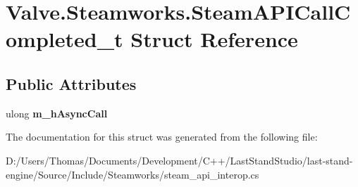 \hypertarget{structValve_1_1Steamworks_1_1SteamAPICallCompleted__t}{}\section{Valve.\+Steamworks.\+Steam\+A\+P\+I\+Call\+Completed\+\_\+t Struct Reference}
\label{structValve_1_1Steamworks_1_1SteamAPICallCompleted__t}
\subsection*{Public Attributes}
\begin{DoxyCompactItemize}
\item 
\hypertarget{structValve_1_1Steamworks_1_1SteamAPICallCompleted__t_aebf4f3279e7ec6a33b5b76f14632127a}{}ulong {\bfseries m\+\_\+h\+Async\+Call}\label{structValve_1_1Steamworks_1_1SteamAPICallCompleted__t_aebf4f3279e7ec6a33b5b76f14632127a}

\end{DoxyCompactItemize}


The documentation for this struct was generated from the following file\+:\begin{DoxyCompactItemize}
\item 
D\+:/\+Users/\+Thomas/\+Documents/\+Development/\+C++/\+Last\+Stand\+Studio/last-\/stand-\/engine/\+Source/\+Include/\+Steamworks/steam\+\_\+api\+\_\+interop.\+cs\end{DoxyCompactItemize}
